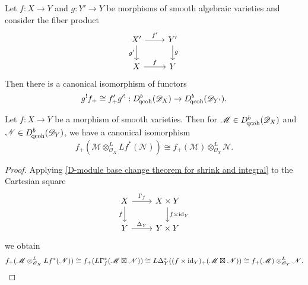 \begin{theorem}\label{D-module base change theorem for shrink and integral}
Let $f:X\to Y$ and $g:Y'\to Y$ be morphisms of smooth algebraic varieties and consider the fiber product
\[\begin{tikzcd}
X'\ar[r,"f'"]\ar[d,swap,"g'"]&Y'\ar[d,"g"]\\
X\ar[r,"f"]&Y
\end{tikzcd}\]
Then there is a canonical isomorphism of functors
\[g^!f_+\cong f'_+g'^!:D^b_{\!\mathrm{qcoh}}(\mathscr{D}_X)\to D^b_{\!\mathrm{qcoh}}(\mathscr{D}_{Y'}).\]
\end{theorem}

\begin{corollary}\label{D-module direct image functor projection formula}
Let $f:X\to Y$ be a morphism of smooth varieties. Then for $\mathscr{M}\in D_{\!\mathrm{qcoh}}^b(\mathscr{D}_X)$ and $\mathscr{N}\in D_{\!\mathrm{qcoh}}^b(\mathscr{D}_Y)$, we have a canonical isomorphism
\[f_+(\mathscr{M}\otimes_{\mathscr{O}_X}^LLf^*(\mathscr{N}))\cong f_+(\mathscr{M})\otimes_{\mathscr{O}_Y}^L\mathscr{N}.\] 
\end{corollary}
\begin{proof}
Applying \cref{D-module base change theorem for shrink and integral} to the Cartesian square
\[\begin{tikzcd}
X\ar[r,"\Gamma_f"]\ar[d,swap,"f"]&X\times Y\ar[d,"f\times \id_Y"]\\
Y\ar[r,"\Delta_Y"]&Y\times Y
\end{tikzcd}\]
we obtain
\begin{equation*}
f_+(\mathscr{M}\otimes_{\mathscr{O}_X}^LLf^*(\mathscr{N}))\cong f_+(L\Gamma_f^*(\mathscr{M}\boxtimes\mathscr{N}))\cong L\Delta_Y^*((f\times\operatorname{id}_Y)_+(\mathscr{M}\boxtimes\mathscr{N}))\cong  f_+(\mathscr{M})\otimes_{\mathscr{O}_Y}^L\mathscr{N}.\qedhere
\end{equation*}
\end{proof}

